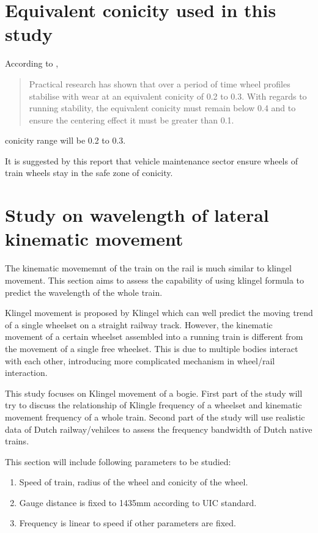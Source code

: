 \section{Equivalent conicity used in this study}
According to \citet[Section.2.6]{esveld2001modern}, 

\begin{quote}
    Practical research has shown that over a period of time wheel profiles stabilise with wear at an equivalent conicity of 0.2 to 0.3. With regards to running stability, the equivalent conicity must remain below 0.4 and to ensure the centering effect it must be greater than 0.1.
\end{quote}

conicity range will be 0.2 to 0.3.

It is suggested by this report that vehicle maintenance sector ensure wheels of train wheels stay in the safe zone of conicity. 


\section{Study on wavelength of lateral kinematic movement}

The kinematic movememnt of the train on the rail is much similar to klingel movement. This section aims to assess the capability of using klingel formula to predict the wavelength of the whole train.

Klingel movement is proposed by Klingel which can well predict the moving trend of a single wheelset on a straight railway track. However, the kinematic movement of a certain wheelset assembled into a running train is different from the movement of a single free wheelset. This is due to multiple bodies interact with each other, introducing more complicated mechanism in wheel/rail interaction. 

This  study focuses on Klingel movement of a bogie. First part of the  study will try to discuss the relationship of Klingle frequency of a wheelset and kinematic movement frequency of a whole train. Second part of the study will use realistic data of Dutch railway/vehilces to assess the frequency bandwidth of Dutch native trains.

This section will include following parameters to be studied:

\begin{enumerate}[-]
	\item Speed of train, radius of the wheel and conicity of the wheel. 
	\item Gauge distance is fixed to 1435mm according to UIC standard. 
	\item Frequency is linear to speed if other parameters are fixed.
\end{enumerate}


